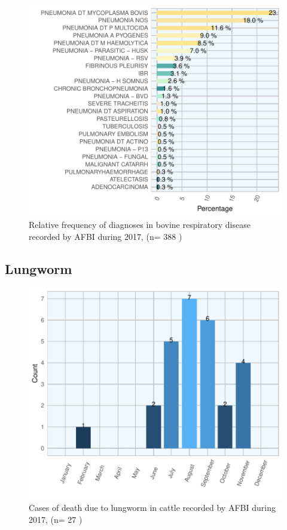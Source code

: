 \documentclass[]{book}
\begin{document}
\begin{figure}

{\centering \includegraphics{AFBI_files/figure-latex/unnamed-chunk-27-1} 

}

\caption{Relative frequency of diagnoses in bovine respiratory disease recorded by AFBI during 2017, (n= 388 )}\label{fig:unnamed-chunk-27}
\end{figure}

\subsection{Lungworm}\label{lungworm}

\begin{figure}

{\centering \includegraphics{AFBI_files/figure-latex/unnamed-chunk-30-1} 

}

\caption{Cases of death due to lungworm in cattle recorded by AFBI during 2017, (n= 27 )}\label{fig:unnamed-chunk-30}
\end{figure}
\end{document}
